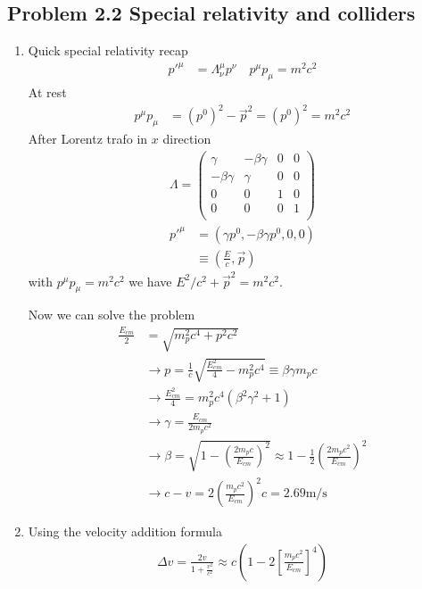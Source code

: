 \documentclass[10pt,a4paper]{book}
\theoremstyle{definition}
\begin{document}
\subsection{Problem 2.2 Special relativity and colliders}
\begin{enumerate}
    \item Quick special relativity recap
    \begin{align}
        p'^\mu&=\Lambda^\mu_\nu p^\nu\quad p^\mu p_\mu=m^2c^2
    \end{align}
    At rest
    \begin{align}
        p^\mu p_\mu&=(p^0)^2-\vec{p}^2=(p^0)^2=m^2c^2
    \end{align}
    After Lorentz trafo in $x$ direction
    \begin{align}
        \Lambda=\begin{pmatrix}
        \gamma & -\beta\gamma & 0 & 0\\
        -\beta\gamma & \gamma & 0 & 0\\
        0 & 0 & 1 & 0\\
        0 & 0 & 0 & 1\\
        \end{pmatrix}
    \end{align}
    \begin{align}
        p'^\mu&=(\gamma p^0,-\beta\gamma p^0,0,0)\\
        &\equiv\left(\frac{E}{c},\vec{p}\right)
    \end{align}
    with $p^\mu p_\mu=m^2c^2$ we have $E^2/c^2+\vec{p}^2=m^2c^2$.
    
    Now we can solve the problem
    \begin{align}
        \frac{E_{cm}}{2}&=\sqrt{m_p^2c^4+p^2c^2}\\
        &\rightarrow p = \frac{1}{c}\sqrt{\frac{E_{cm}^2}{4}-m_p^2c^4}\equiv\beta\gamma m_pc\\
        &\rightarrow \frac{E_{cm}^2}{4}=m_p^2c^4(\beta^2\gamma^2+1)\\
        &\rightarrow \gamma=\frac{E_{cm}}{2m_pc^2}\\
        &\rightarrow\beta=\sqrt{1-\left(\frac{2m_pc}{E_{cm}}\right)^2}\approx1-\frac{1}{2}\left(\frac{2m_pc^2}{E_{cm}}\right)^2\\
        &\rightarrow c-v=2\left(\frac{m_pc^2}{E_{cm}}\right)^2c=2.69\text{m/s}
    \end{align}
    \item Using the velocity addition formula
    \begin{align}
        \Delta v=\frac{2v}{1+\frac{v^2}{c^2}}\approx c\left(1-2\left[\frac{m_pc^2}{E_{cm}}\right]^4\right)
    \end{align}
\end{enumerate}
\end{document}
